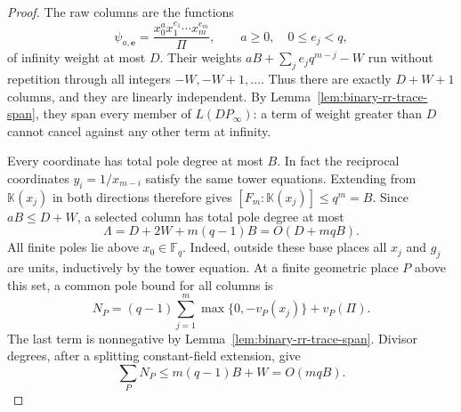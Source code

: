 \documentclass[11pt,letterpaper]{article}
\numberwithin{equation}{section}
\begin{document}
\begin{proof}
The raw columns are the functions
\begin{equation}
 \psi_{a,\boldsymbol e}=
 \frac{x_0^a x_1^{e_1}\cdots x_m^{e_m}}{\Pi},
 \qquad a\geq0,\quad0\leq e_j<q,
 \label{eq:binary-rr-raw-columns}
\end{equation}
of infinity weight at most $D$.
Their weights $aB+\sum_j e_jq^{m-j}-W$ run without repetition through all integers $-W,-W+1,\ldots$.
Thus there are exactly $D+W+1$ columns, and they are linearly independent.
By Lemma~\ref{lem:binary-rr-trace-span}, they span every member of $L(DP_\infty)$: a term of weight greater than $D$ cannot cancel against any other term at infinity.

Every coordinate has total pole degree at most $B$.
In fact the reciprocal coordinates $y_i=1/x_{m-i}$ satisfy the same tower equations.
Extending from $\mathbb K(x_j)$ in both directions therefore gives $[F_m:\mathbb K(x_j)]\leq q^m=B$.
Since $aB\leq D+W$, a selected column has total pole degree at most
\begin{equation}
 \Lambda=D+2W+m(q-1)B=O(D+mqB).
 \label{eq:binary-rr-column-height}
\end{equation}
All finite poles lie above $x_0\in\mathbb F_q$.
Indeed, outside these base places all $x_j$ and $g_j$ are units, inductively by the tower equation.
At a finite geometric place $P$ above this set, a common pole bound for all columns is
\begin{equation}
 N_P=(q-1)\sum_{j=1}^m\max\{0,-v_P(x_j)\}+v_P(\Pi).
 \label{eq:binary-rr-local-pole-bound}
\end{equation}
The last term is nonnegative by Lemma~\ref{lem:binary-rr-trace-span}.
Divisor degrees, after a splitting constant-field extension, give
\begin{equation}
 \sum_P N_P\leq m(q-1)B+W=O(mqB).
 \label{eq:binary-rr-total-principal-parts}
\end{equation}


\end{proof}
\end{document}
